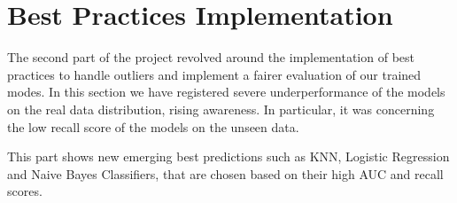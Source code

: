 \documentclass{Configuration_Files/Template}
\begin{document}
\section{Best Practices Implementation}
The second part of the project revolved around the implementation of best practices to handle outliers and implement a fairer evaluation of our trained modes. In this section we have registered severe underperformance of the models on the real data distribution, rising awareness. In particular, it was concerning the low recall score of the models on the unseen data.

This part shows new emerging best predictions such as KNN, Logistic Regression and Naive Bayes Classifiers, that are chosen based on their high AUC and recall scores.


\end{document}
